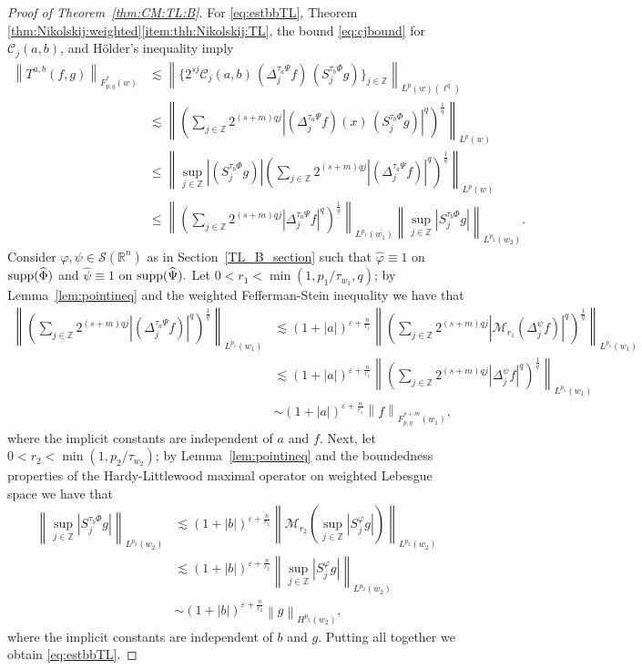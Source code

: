 \documentclass[10pt,a4paper]{article}
\theoremstyle{remark}
\newcommand{\ent}{\mathbb{Z}}
\newcommand{\rn}{{{\mathbb R}^n}}
\newcommand{\sw}{{\mathcal{S}}(\rn)}
\newcommand{\C}{\mathcal{C}}
\newcommand{\M}{\mathcal{M}} %
\newcommand{\Do}[2]{\Delta^{#1}_{#2}}
\newcommand{\So}[2]{S^{#1}_{#2}}
\newcommand{\abs}[1]{\left\vert #1 \right\vert}
\newcommand{\norm}[2]{\left\|#1\right\|_{#2}}
\newcommand{\supp}{{\rm{supp}}}
\begin{document}
\begin{proof}[Proof of Theorem~\ref{thm:CM:TL:B}]
For \eqref{eq:estbbTL},
Theorem \ref{thm:Nikolskij:weighted}\eqref{item:thh:Nikolskij:TL}, the bound \eqref{eq:cjbound} for $\C_j(a,b)$, and H\"older's inequality  imply
\begin{align*}
\norm{T^{a,b}(f,g)}{\dot{F}^s_{p,q}(w)} & \lesssim \norm{\{2^{sj} \C_j(a,b) \,(\Do{ \tau_a \Psi }{j} f ) \, (\So{ \tau_b \Phi }{j} g)\}_{j\in\ent} }{L^p(w)(\ell^q)}\\
& \lesssim \norm{\left(\sum\limits_{j \in \ent}  2^{(s +m) q j}  |(\Do{ \tau_a \Psi }{j} f )(x) \, (\So{ \tau_b \Phi }{j} g)|^q   \right)^\frac{1}{q}}{L^p(w)}\\
& \le\norm{\sup\limits_{j \in \ent} |(\So{ \tau_b \Phi }{j} g)| \left(\sum\limits_{j \in \ent}  2^{(s +m) q j}  |(\Do{ \tau_a \Psi }{j} f )|^q   \right)^\frac{1}{q}}{L^p(w)}\\
& \le \norm{\left(\sum_{j \in \ent}  2^{(s +m) q j}  |\Do{ \tau_a \Psi }{j} f |^q   \right)^\frac{1}{q}}{L^{p_1}(w_1)} \norm{\sup\limits_{j \in \ent} |\So{ \tau_b \Phi }{j} g|}{L^{p_2}(w_2)}.
\end{align*}
Consider $\varphi,\psi\in\sw$ as in Section~\ref{TL_B_section} such that   $\widehat{\varphi}\equiv 1$ on $\supp(\widehat{\Phi})$ and  $\widehat{\psi}\equiv 1$ on $\supp(\widehat{\Psi}).$  Let   $0<r_1<\min(1, p_1/\tau_{w_1},q)$; by Lemma~\ref{lem:pointineq} and the weighted Fefferman-Stein inequality  we have that  
\begin{align*}
\norm{\left(\sum_{j \in \ent}  2^{(s +m) q j}  |(\Do{ \tau_a \Psi }{j} f )|^q   \right)^\frac{1}{q}}{L^{p_1}(w_1)}&\lesssim (1+\abs{a})^{\varepsilon+\frac{n}{r_1}}
\norm{\left(\sum_{j \in \ent}  2^{(s +m) q j}  |\M_{r_1}(\Do{\psi }{j} f) |^q   \right)^\frac{1}{q}}{L^{p_1}(w_1)}\\
&\lesssim (1+\abs{a})^{\varepsilon+\frac{n}{r_1}} \norm{\left(\sum_{j \in \ent}  2^{(s +m) q j}  |\Do{\psi }{j} f|^q   \right)^\frac{1}{q}}{L^{p_1}(w_1)}\\
&\sim (1+\abs{a})^{\varepsilon+\frac{n}{r_1}}  \norm{f}{\dot{F}^{s+m}_{p,q}(w_1)},
\end{align*}
where the implicit constants are independent of $a$ and $f.$ Next, let  $0<r_2<\min(1,p_2/\tau_{w_2})$; by Lemma~\ref{lem:pointineq} and the boundedness properties of the Hardy-Littlewood maximal operator on weighted Lebesgue space  we have that  
\begin{align*}
\norm{\sup_{j\in\ent}|\So{\tau_b\Phi}{j}g|}{L^{p_2}(w_2)}&\lesssim (1+\abs{b})^{\varepsilon+\frac{n}{r_2}} \norm{\M_{r_2}(\sup_{j\in\ent}|\So{\varphi}{j}g|)}{L^{p_2}(w_2)}\\
&\lesssim (1+\abs{b})^{\varepsilon+\frac{n}{r_2}} \norm{\sup_{j\in\ent}|\So{\varphi}{j}g|}{L^{p_2}(w_2)}\\
&\sim (1+\abs{b})^{\varepsilon+\frac{n}{r_2}} \norm{g}{H^{p_2}(w_2)},
\end{align*}
where the implicit constants are independent of $b$ and $g.$ Putting all together we obtain \eqref{eq:estbbTL}.



\end{proof}
\end{document}
